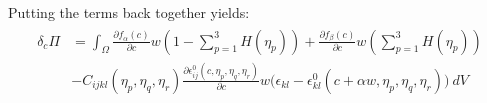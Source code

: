 \documentclass[11pt]{article}
\renewcommand{\=}[1]{\stackrel{#1}{=}} %
\theoremstyle{definition}
\theoremstyle{remark}
\begin{document}
Putting the terms back together yields:
\begin{gather}
\begin{split}
\delta_{c} \Pi  &=  \int_{\Omega}  \frac{\partial f_{\alpha}(c)}{\partial c} w \left(1-\sum_{p=1}^3 H(\eta_p)\right) +\frac{\partial f_{\beta}(c)}{\partial c} w \left(\sum_{p=1}^3 H(\eta_p)\right) \\
&-C_{ijkl}(\eta_p,\eta_q,\eta_r) \frac{\partial \epsilon_{ij}^0 (c,\eta_p,\eta_q,\eta_r)}{\partial c} w \big(\epsilon_{kl}-\epsilon_{kl}^0 (c+\alpha w,\eta_p,\eta_q,\eta_r)\big) ~dV
\end{split}
\end{gather}
\end{document}
